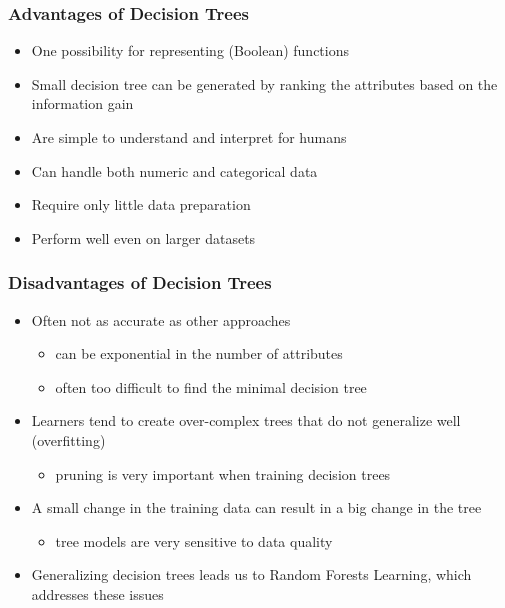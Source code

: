 \documentclass[conference, a4paper]{styles/acmsiggraph}
\begin{document}
        \subsubsection{Advantages of Decision Trees}
            \begin{itemize}
                \item One possibility for representing (Boolean) functions
                \item Small decision tree can be generated by ranking the attributes based on the information gain
                \item Are simple to understand and interpret for humans
                \item Can handle both numeric and categorical data
                \item Require only little data preparation
                \item Perform well even on larger datasets
            \end{itemize}
        
        \subsubsection{Disadvantages of Decision Trees}
            \begin{itemize}
                \item Often not as accurate as other approaches
                \begin{itemize}
                    \item can be exponential in the number of attributes
                    \item often too difficult to find the minimal decision tree
                \end{itemize}
                \item Learners tend to create over-complex trees that do not generalize well (overfitting)
                \begin{itemize}
                    \item pruning is very important when training decision trees
                \end{itemize}
                \item A small change in the training data can result in a big change in the tree
                \begin{itemize}
                    \item tree models are very sensitive to data quality
                \end{itemize}
                \item Generalizing decision trees leads us to Random Forests Learning, which addresses these issues
            \end{itemize}
        
\end{document}
